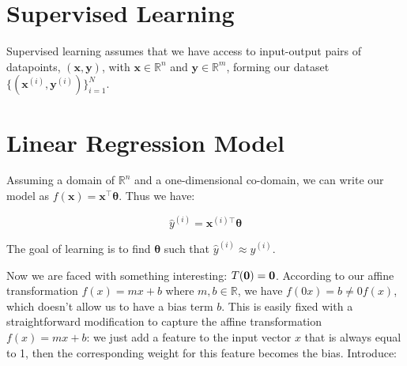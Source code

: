 \section{Supervised Learning}
Supervised learning assumes that we have access to input-output pairs of datapoints, $(\bm{x}, \bm{y})$, with $\bm{x} \in \mathbb{R}^n$ and $\bm{y} \in \mathbb{R}^m$, forming our dataset $\{(\bm{x}^{(i)}, \bm{y}^{(i)})\}_{i=1}^N$. 


\section{Linear Regression Model}
Assuming a domain of $\mathbb{R}^n$ and a one-dimensional co-domain, we can write our model as $f(\bm{x}) = \bm{x}^\top \bm{\theta}$. Thus we have:




\[
\hat{y}^{(i)} = \bm{x}^{(i)\top} \bm{\theta}
\]

The goal of learning is to find $\bm{\theta}$ such that $\hat{y}^{(i)} \approx y^{(i)}$. 






Now we are faced with something interesting: $T(\mathbf{0}) = \mathbf{0}$. According to our affine transformation $f(x) = mx+b $ where $m,b \in \mathbb{R}$, we have $f(0x) = b \neq 0f(x)$, which doesn't allow us to have a bias term $b$. This is easily fixed with a straightforward modification to capture the affine transformation $f(x) = mx + b$: we just add a feature to the input vector $x$ that is always equal to 1, then the corresponding weight for this feature becomes the bias. Introduce:

